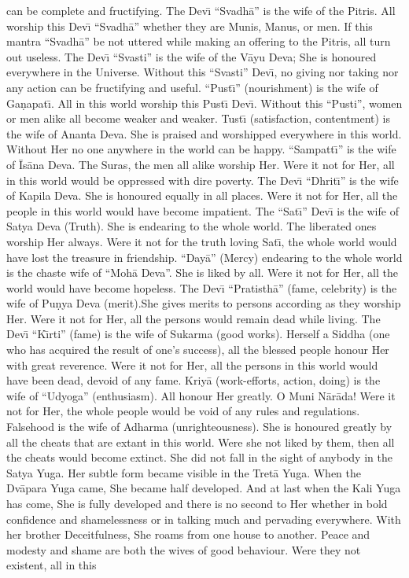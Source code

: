 can be complete and fructifying. The Dev\={\i} ``Svadh\=a'' is the wife of the Pitris. All worship this Dev\={\i} ``Svadh\=a'' whether they are Munis, Manus, or men. If this mantra ``Svadh\=a'' be not uttered while making an offering to the Pitris, all turn out useless. The Dev\={\i} ``Svasti'' is the wife of the V\=ayu Deva; She is honoured everywhere in the Universe. Without this ``Svasti'' Dev\={\i}, no giving nor taking nor any action can be fructifying and useful. ``Pust\={\i}'' (nourishment) is the wife of Ga\d{n}apat\={\i}. All in this world worship this Pust\={\i} Dev\={\i}. Without this ``Pusti'', women or men alike all become weaker and weaker. Tust\={\i} (satisfaction, contentment) is the wife of Ananta Deva. She is praised and worshipped everywhere in this world. Without Her no one anywhere in the world can be happy. ``Sampatt\={\i}'' is the wife of \=Is\=ana Deva. The Suras, the men all alike worship Her. Were it not for Her, all in this world would be oppressed with dire poverty. The Dev\={\i} ``Dhrit\={\i}'' is the wife of Kapila Deva. She is honoured equally in all places. Were it not for Her, all the people in this world would have become impatient. The ``Sat\={\i}'' Dev\={\i} is the wife of Satya Deva (Truth). She is endearing to the whole world. The liberated ones worship Her always. Were it not for the truth loving Sat\={\i}, the whole world would have lost the treasure in friendship. ``Day\=a'' (Mercy) endearing to the whole world is the chaste wife of ``Moh\=a Deva''. She is liked by all. Were it not for Her, all the world would have become hopeless. The Dev\={\i} ``Pratisth\=a'' (fame, celebrity) is the wife of Pu\d{n}ya Deva (merit).She gives merits to persons according as they worship Her. Were it not for Her, all the persons would remain dead while living. The Dev\={\i} ``K\={\i}rti'' (fame) is the wife of Sukarma (good works). Herself a Siddha (one who has acquired the result of one's success), all the blessed people honour Her with great reverence. Were it not for Her, all the persons in this world would have been dead, devoid of any fame. Kriy\=a (work-efforts, action, doing) is the wife of ``Udyoga'' (enthusiasm). All honour Her greatly. O Muni N\=ar\=ada! Were it not for Her, the whole people would be void of any rules and regulations. Falsehood is the wife of Adharma (unrighteousness). She is honoured greatly by all the cheats that are extant in this world. Were she not liked by them, then all the cheats would become extinct. She did not fall in the sight of anybody in the Satya Yuga. Her subtle form became visible in the Tret\=a Yuga. When the Dv\=apara Yuga came, She became half developed. And at last when the Kali Yuga has come, She is fully developed and there is no second to Her whether in bold confidence and shamelessness or in talking much and pervading everywhere. With her brother Deceitfulness, She roams from one house to another. Peace and modesty and shame are both the wives of good behaviour. Were they not existent, all in this

